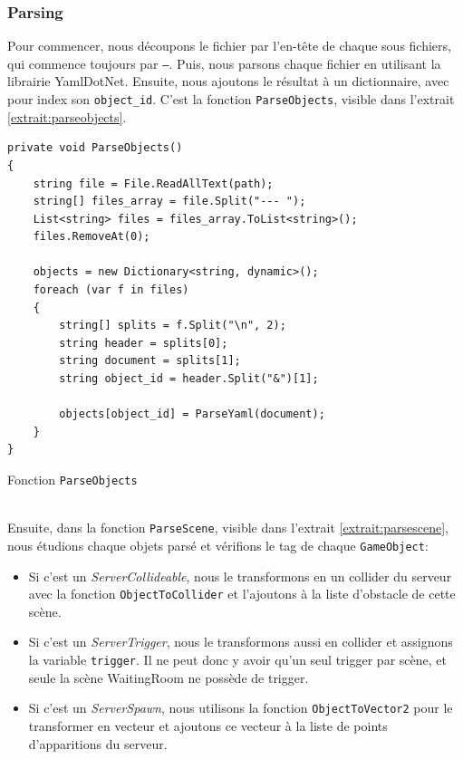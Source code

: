\documentclass[a4paper]{article}
\begin{document}
\subsubsection{Parsing}
Pour commencer, nous découpons le fichier par l'en-tête de chaque sous fichiers, qui commence toujours par \texttt{---}. Puis, nous parsons chaque fichier en utilisant la librairie YamlDotNet\cite{yamldotnet}. Ensuite, nous ajoutons le résultat à un dictionnaire, avec pour index son \texttt{object_id}. C'est la fonction \texttt{ParseObjects}, visible dans l'extrait \ref{extrait:parseobjects}. 
\begin{listing}[!ht]
\begin{verbatim}
private void ParseObjects()
{
    string file = File.ReadAllText(path);
    string[] files_array = file.Split("--- ");
    List<string> files = files_array.ToList<string>();
    files.RemoveAt(0);

    objects = new Dictionary<string, dynamic>();
    foreach (var f in files)
    {
        string[] splits = f.Split("\n", 2);
        string header = splits[0];
        string document = splits[1];
        string object_id = header.Split("&")[1];

        objects[object_id] = ParseYaml(document);
    }
}
\end{verbatim}
\caption{Fonction \texttt{ParseObjects}}
\label{extrait:parseobjects}
\end{listing} \\
Ensuite, dans la fonction \texttt{ParseScene}, visible dans l'extrait \ref{extrait:parsescene}, nous étudions chaque objets parsé et vérifions le tag de chaque \texttt{GameObject}:
\begin{itemize}
\item Si c'est un \textit{ServerCollideable}, nous le transformons en un collider du serveur avec la fonction \texttt{ObjectToCollider} et l'ajoutons à la liste d'obstacle de cette scène.
\item Si c'est un \textit{ServerTrigger}, nous le transformons aussi en collider et assignons la variable \texttt{trigger}. Il ne peut donc y avoir qu'un seul trigger par scène, et seule la scène {WaitingRoom} ne possède de trigger.
\item Si c'est un \textit{ServerSpawn}, nous utilisons la fonction \texttt{ObjectToVector2} pour le transformer en vecteur et ajoutons ce vecteur à la liste de points d'apparitions du serveur. 
\end{itemize}
\end{document}
